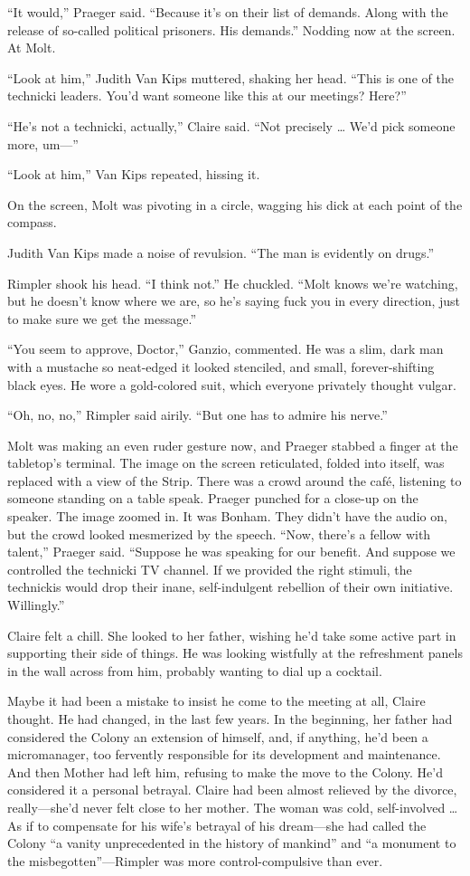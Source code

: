 “It would,” Praeger said. “Because it’s on their list of demands. Along with the release of so-called political prisoners. His demands.” Nodding now at the screen. At Molt.

“Look at him,” Judith Van Kips muttered, shaking her head. “This is one of the technicki leaders. You’d want someone like this at our meetings? Here?”

“He’s not a technicki, actually,” Claire said. “Not precisely … We’d pick someone more, um—”

“Look at him,” Van Kips repeated, hissing it.

On the screen, Molt was pivoting in a circle, wagging his dick at each point of the compass.

Judith Van Kips made a noise of revulsion. “The man is evidently on drugs.”

Rimpler shook his head. “I think not.” He chuckled. “Molt knows we’re watching, but he doesn’t know where we are, so he’s saying fuck you in every direction, just to make sure we get the message.”

“You seem to approve, Doctor,” Ganzio, commented. He was a slim, dark man with a mustache so neat-edged it looked stenciled, and small, forever-shifting black eyes. He wore a gold-colored suit, which everyone privately thought vulgar.

“Oh, no, no,” Rimpler said airily. “But one has to admire his nerve.”

Molt was making an even ruder gesture now, and Praeger stabbed a finger at the tabletop’s terminal. The image on the screen reticulated, folded into itself, was replaced with a view of the Strip. There was a crowd around the café, listening to someone standing on a table speak. Praeger punched for a close-up on the speaker. The image zoomed in. It was Bonham. They didn’t have the audio on, but the crowd looked mesmerized by the speech. “Now, there’s a fellow with talent,” Praeger said. “Suppose he was speaking for our benefit. And suppose we controlled the technicki TV channel. If we provided the right stimuli, the technickis would drop their inane, self-indulgent rebellion of their own initiative. Willingly.”

Claire felt a chill. She looked to her father, wishing he’d take some active part in supporting their side of things. He was looking wistfully at the refreshment panels in the wall across from him, probably wanting to dial up a cocktail.

Maybe it had been a mistake to insist he come to the meeting at all, Claire thought. He had changed, in the last few years. In the beginning, her father had considered the Colony an extension of himself, and, if anything, he’d been a micromanager, too fervently responsible for its development and maintenance. And then Mother had left him, refusing to make the move to the Colony. He’d considered it a personal betrayal. Claire had been almost relieved by the divorce, really—she’d never felt close to her mother. The woman was cold, self-involved … As if to compensate for his wife’s betrayal of his dream—she had called the Colony “a vanity unprecedented in the history of mankind” and “a monument to the misbegotten”—Rimpler was more control-compulsive than ever.


